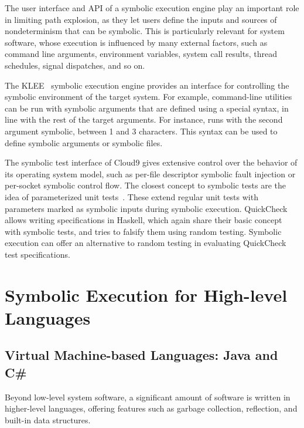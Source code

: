 The user interface and API of a symbolic execution engine play an important role in limiting path explosion, as they let users define the inputs and sources of nondeterminism that can be symbolic.  This is particularly relevant for system software, whose execution is influenced by many external factors, such as command line arguments, environment variables, system call results, thread schedules, signal dispatches, and so on.

The KLEE~\cite{klee} symbolic execution engine provides an interface for controlling the symbolic environment of the target system.  For example, command-line utilities can be run with symbolic arguments that are defined using a special syntax, in line with the rest of the target arguments.  For instance,  runs  with the second argument symbolic, between 1 and 3 characters.  This syntax can be used to define symbolic arguments or symbolic files.

The symbolic test interface of Cloud9 gives extensive control over the behavior of its operating system model, such as per-file descriptor symbolic fault injection or per-socket symbolic control flow.
%
The closest concept to symbolic tests are the idea of parameterized unit tests~\cite{tillmann-puts}. These extend regular unit tests with parameters marked as symbolic inputs during symbolic execution.
%
QuickCheck~\cite{quickcheck} allows writing specifications in Haskell, which again share their basic concept with symbolic tests, and tries to falsify them using random testing.  Symbolic execution can offer an alternative to random testing in evaluating QuickCheck test specifications.


\section{Symbolic Execution for High-level Languages}
\label{sec:relwork:interplang}

\subsection{Virtual Machine-based Languages: Java and C\#}

Beyond low-level system software, a significant amount of software is written in higher-level languages, offering features such as garbage collection, reflection, and built-in data structures.

